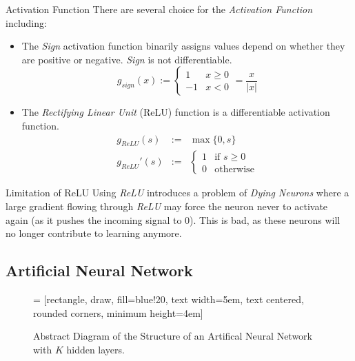 \documentclass[11pt,a4paper]{article}
\begin{document}
  \begin{proposition}{Activation Function}
    There are several choice for the \textit{Activation Function} including:
    \begin{itemize}
      \item The \textit{Sign} activation function binarily assigns values depend on whether they are positive or negative. \textit{Sign} is not differentiable.
      \[ g_{sign}(x):=\begin{cases}1&x\geq0\\-1&x<0\end{cases}=\frac{x}{|x|} \]

      \item The \textit{Rectifying Linear Unit} (ReLU) function is a differentiable activation function.
      \[\begin{array}{rcl}
          g_{ReLU}(s)&:=&\max\{0,s\}\\
          g_{ReLU}'(s)&:=&\begin{cases}1&\text{if }s\geq0\\0&\text{otherwise}\end{cases}
      \end{array}\]
    \end{itemize}
  \end{proposition}

  \begin{remark}{Limitation of ReLU}
    Using \textit{ReLU} introduces a problem of \textit{Dying Neurons} where a large gradient flowing through \textit{ReLU} may force the neuron never to activate again (as it pushes the incoming signal to 0). This is bad, as these neurons will no longer contribute to learning anymore.
  \end{remark}

\subsection{Artificial Neural Network}

  \begin{figure}[ht!]
    \centering
     = [rectangle, draw, fill=blue!20, text width=5em, text centered, rounded corners, minimum height=4em]
    \caption{Abstract Diagram of the Structure of an Artifical Neural Network with $K$ hidden layers.}
    \label{fig:ANN}
  \end{figure}
\end{document}
